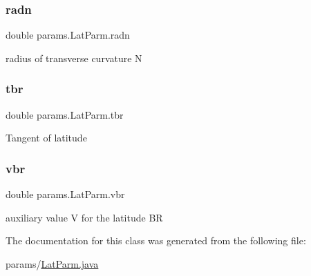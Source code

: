 \subsubsection{\texorpdfstring{radn}{radn}}
{\footnotesize\ttfamily double params.\+Lat\+Parm.\+radn\hspace{0.3cm}{\ttfamily [private]}}

radius of transverse curvature N \mbox{\label{classparams_1_1_lat_parm_a9a38ab3ef2e8fafcf667aa32e714ea33}} 
\subsubsection{\texorpdfstring{tbr}{tbr}}
{\footnotesize\ttfamily double params.\+Lat\+Parm.\+tbr\hspace{0.3cm}{\ttfamily [private]}}

Tangent of latitude \mbox{\label{classparams_1_1_lat_parm_ab4fe89614c538fbc5135ff84699ade62}} 
\subsubsection{\texorpdfstring{vbr}{vbr}}
{\footnotesize\ttfamily double params.\+Lat\+Parm.\+vbr\hspace{0.3cm}{\ttfamily [private]}}

auxiliary value V for the latitude BR 

The documentation for this class was generated from the following file\+:\begin{DoxyCompactItemize}
\item 
params/\hyperlink{_lat_parm_8java}{Lat\+Parm.\+java}\end{DoxyCompactItemize}
